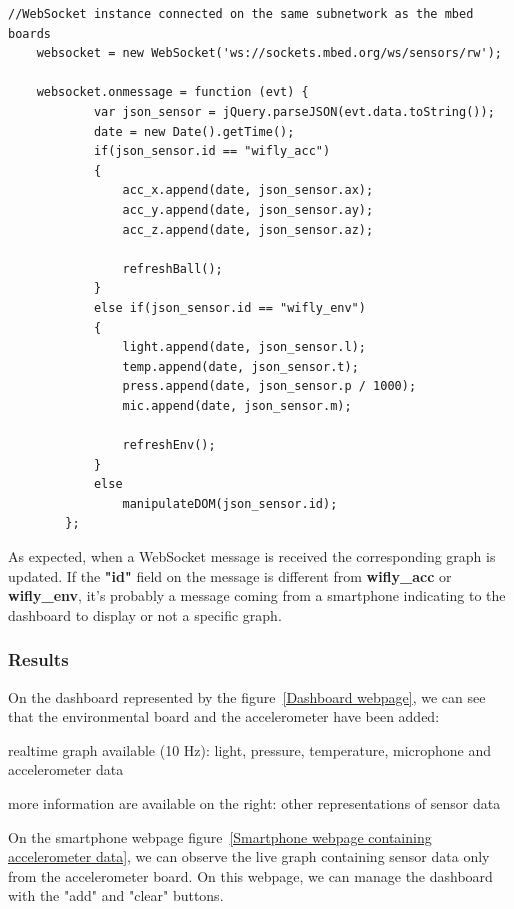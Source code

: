 \documentclass[pdftex,10pt,a4paper]{report}
\newenvironment{packed_item}{
\begin{itemize}
  \setlength{\itemsep}{1pt}
  \setlength{\parskip}{0pt}
  \setlength{\parsep}{0pt}
}{\end{itemize}}
\begin{document}
\begin{center}
\begin{lstlisting}[label=Manipulation of WebSocket messages by the dashboard,caption=Manipulation of WebSocket messages by the dashboard]
    //WebSocket instance connected on the same subnetwork as the mbed boards
    websocket = new WebSocket('ws://sockets.mbed.org/ws/sensors/rw');

    websocket.onmessage = function (evt) {
			var json_sensor = jQuery.parseJSON(evt.data.toString());
			date = new Date().getTime();
			if(json_sensor.id == "wifly_acc") 
			{
				acc_x.append(date, json_sensor.ax);
				acc_y.append(date, json_sensor.ay);
				acc_z.append(date, json_sensor.az);

				refreshBall();
			}
			else if(json_sensor.id == "wifly_env") 
			{
				light.append(date, json_sensor.l);
				temp.append(date, json_sensor.t);
				press.append(date, json_sensor.p / 1000);
				mic.append(date, json_sensor.m);

				refreshEnv();
			}
			else
				manipulateDOM(json_sensor.id);
		};
	\end{lstlisting}
\end{center}

As expected, when a WebSocket message is received the corresponding graph is updated. If the \textbf{"id"} field on the message is different from \textbf{wifly\_acc} or \textbf{wifly\_env}, it's probably a message coming from a smartphone indicating to the dashboard to display or not a specific graph. 

\subsubsection{Results}

On the dashboard represented by the figure~\ref{Dashboard webpage}, we can see that the environmental board and the accelerometer have been added:
\begin{packed_item}
	\item realtime graph available (10 Hz): light, pressure, temperature, microphone and accelerometer data
	\item more information are available on the right: other representations of sensor data
\end{packed_item}

On the smartphone webpage figure~\ref{Smartphone webpage containing accelerometer data}, we can observe the live graph containing sensor data only from the accelerometer board. On this webpage, we can manage the dashboard with the "add" and "clear" buttons.
\end{document}
